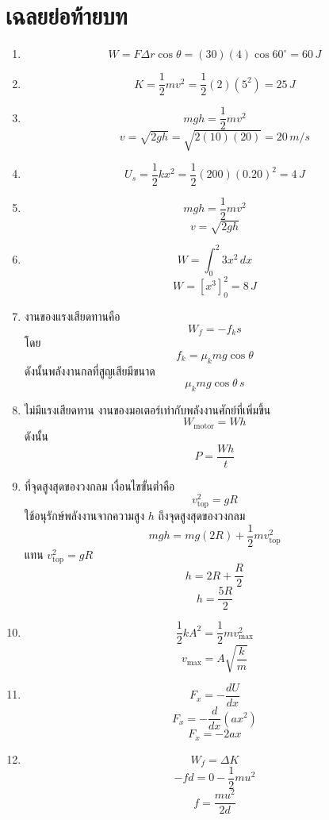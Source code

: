 \section{เฉลยย่อท้ายบท}

\begin{enumerate}
    \item
    \[
    W=F\Delta r\cos\theta=(30)(4)\cos60^\circ=60\,\si{J}
    \]

    \item
    \[
    K=\frac{1}{2}mv^2=\frac{1}{2}(2)(5^2)=25\,\si{J}
    \]

    \item
    \[
    mgh=\frac{1}{2}mv^2
    \]
    \[
    v=\sqrt{2gh}=\sqrt{2(10)(20)}=20\,\si{m/s}
    \]

    \item
    \[
    U_s=\frac{1}{2}kx^2=\frac{1}{2}(200)(0.20)^2=4\,\si{J}
    \]

    \item
    \[
    mgh=\frac{1}{2}mv^2
    \]
    \[
    v=\sqrt{2gh}
    \]

    \item
    \[
    W=\int_0^2 3x^2\,dx
    \]
    \[
    W=[x^3]_0^2=8\,\si{J}
    \]

    \item
    งานของแรงเสียดทานคือ
    \[
    W_f=-f_k s
    \]
    โดย
    \[
    f_k=\mu_kmg\cos\theta
    \]
    ดังนั้นพลังงานกลที่สูญเสียมีขนาด
    \[
    \mu_kmg\cos\theta\,s
    \]

    \item
    ไม่มีแรงเสียดทาน งานของมอเตอร์เท่ากับพลังงานศักย์ที่เพิ่มขึ้น
    \[
    W_{\text{motor}}=Wh
    \]
    ดังนั้น
    \[
    P=\frac{Wh}{t}
    \]

    \item
    ที่จุดสูงสุดของวงกลม เงื่อนไขขั้นต่ำคือ
    \[
    v_{\text{top}}^2=gR
    \]
    ใช้อนุรักษ์พลังงานจากความสูง $h$ ถึงจุดสูงสุดของวงกลม
    \[
    mgh=mg(2R)+\frac{1}{2}mv_{\text{top}}^2
    \]
    แทน $v_{\text{top}}^2=gR$
    \[
    h=2R+\frac{R}{2}
    \]
    \[
    h=\frac{5R}{2}
    \]

    \item
    \[
    \frac{1}{2}kA^2=\frac{1}{2}mv_{\max}^2
    \]
    \[
    v_{\max}=A\sqrt{\frac{k}{m}}
    \]

    \item
    \[
    F_x=-\frac{dU}{dx}
    \]
    \[
    F_x=-\frac{d}{dx}(ax^2)
    \]
    \[
    F_x=-2ax
    \]

    \item
    \[
    W_f=\Delta K
    \]
    \[
    -fd=0-\frac{1}{2}mu^2
    \]
    \[
    f=\frac{mu^2}{2d}
    \]
\end{enumerate}

